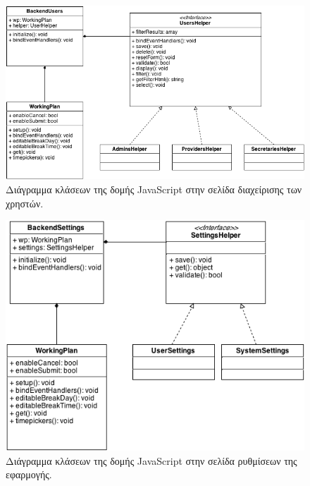 \begin{figure}
\centering
\includegraphics[width=150mm]{images/cd-backend-users.png}
\caption{Διάγραμμα κλάσεων της δομής JavaScript στην σελίδα διαχείρισης των χρηστών.}
\label{cd-backend-users}
\end{figure}

\begin{figure}
\centering
\includegraphics[width=150mm]{images/cd-backend-settings.png}
\caption{Διάγραμμα κλάσεων της δομής JavaScript στην σελίδα ρυθμίσεων της εφαρμογής.}
\label{cd-backend-settings}
\end{figure}
